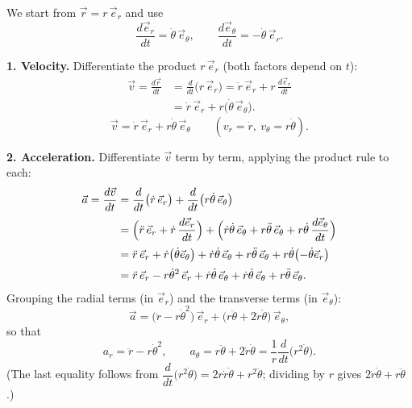\documentclass[11pt]{article}
\begin{document}
\begin{corrige}
We start from $\vec{r} = r\,\vec{e}_r$ and use
\[ \frac{d\vec{e}_r}{dt} = \dot{\theta}\,\vec{e}_\theta, \qquad \frac{d\vec{e}_\theta}{dt} = -\dot{\theta}\,\vec{e}_r. \]

\textbf{1. Velocity.} Differentiate the product $r\,\vec{e}_r$ (both factors depend on $t$):
\begin{align*}
\vec{v} = \frac{d\vec{r}}{dt} &= \frac{d}{dt}\bigl(r\,\vec{e}_r\bigr) = \dot{r}\,\vec{e}_r + r\,\frac{d\vec{e}_r}{dt} \\
&= \dot{r}\,\vec{e}_r + r\bigl(\dot{\theta}\,\vec{e}_\theta\bigr).
\end{align*}
\[ \vec{v} = \dot{r}\,\vec{e}_r + r\dot{\theta}\,\vec{e}_\theta \qquad (v_r = \dot{r},\ v_\theta = r\dot{\theta}). \]

\textbf{2. Acceleration.} Differentiate $\vec{v}$ term by term, applying the product rule to each:
\begin{align*}
\vec{a} = \frac{d\vec{v}}{dt} &= \frac{d}{dt}\bigl(\dot{r}\,\vec{e}_r\bigr) + \frac{d}{dt}\bigl(r\dot{\theta}\,\vec{e}_\theta\bigr) \\[2pt]
&= \Bigl(\ddot{r}\,\vec{e}_r + \dot{r}\,\frac{d\vec{e}_r}{dt}\Bigr) + \Bigl(\dot{r}\dot{\theta}\,\vec{e}_\theta + r\ddot{\theta}\,\vec{e}_\theta + r\dot{\theta}\,\frac{d\vec{e}_\theta}{dt}\Bigr) \\[2pt]
&= \ddot{r}\,\vec{e}_r + \dot{r}\bigl(\dot{\theta}\vec{e}_\theta\bigr) + \dot{r}\dot{\theta}\,\vec{e}_\theta + r\ddot{\theta}\,\vec{e}_\theta + r\dot{\theta}\bigl(-\dot{\theta}\vec{e}_r\bigr) \\[2pt]
&= \ddot{r}\,\vec{e}_r - r\dot{\theta}^2\,\vec{e}_r + \dot{r}\dot{\theta}\,\vec{e}_\theta + \dot{r}\dot{\theta}\,\vec{e}_\theta + r\ddot{\theta}\,\vec{e}_\theta.
\end{align*}
Grouping the radial terms (in $\vec{e}_r$) and the transverse terms (in $\vec{e}_\theta$):
\[ \vec{a} = \bigl(\ddot{r} - r\dot{\theta}^2\bigr)\,\vec{e}_r + \bigl(r\ddot{\theta} + 2\dot{r}\dot{\theta}\bigr)\,\vec{e}_\theta, \]
so that
\[ a_r = \ddot{r} - r\dot{\theta}^2, \qquad a_\theta = r\ddot{\theta} + 2\dot{r}\dot{\theta} = \frac{1}{r}\frac{d}{dt}\bigl(r^2\dot{\theta}\bigr). \]
(The last equality follows from $\dfrac{d}{dt}\bigl(r^2\dot{\theta}\bigr) = 2r\dot{r}\dot{\theta} + r^2\ddot{\theta}$; dividing by $r$ gives $2\dot{r}\dot{\theta} + r\ddot{\theta}$.)
\end{corrige}
\end{document}
